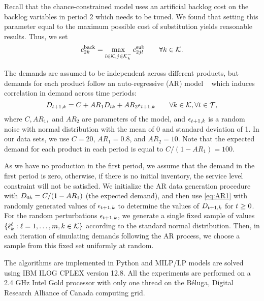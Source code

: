 \documentclass[msom]{oo}
\begin{document}
Recall that the chance-constrained model uses an artificial backlog cost on the backlog variables in period $2$ which needs to be tuned. We found that setting this parameter equal to the maximum possible cost of substitution yields reasonable results. Thus, we set
\begin{equation}
c^\text{back}_{ 2 k} = \max_{l \in \mathcal{K} ,j \in \mathcal{K}^-_k }c^{\text{sub}}_{2 j l  }  \qquad \forall k  \in \mathcal{K}.       \label{eq:backCost}
\end{equation} 


The demands are assumed to be independent across different products, but demands for each product follow an auto-regressive (AR) model ~\citep{jiang2017production} which induces correlation in demand across time periods: 
\begin{equation}
D_{ t+1,k} = C + AR_1 D_{t k} + AR_2 \epsilon_{t+1,k }  \qquad \forall k  \in \mathcal{K} , \forall t \in \mathcal{T},       \label{eq:AR1}
\end{equation}
where $C, AR_1,$ and $AR_2$ are parameters of the model, and $\epsilon_{ t+1,k}$ is a random noise with normal distribution with the mean of 0 and standard deviation of 1. 
In our data sets, we use $C = 20$, $AR_1 = 0.8$, and $AR_2 = 10$. Note that the expected demand for each product in each period is equal to $C/(1-AR_1)=100$. 

As we have no production in the first period, we assume that the demand in the first period is zero, otherwise, if there is no initial inventory, the service level constraint will not be satisfied. We initialize the AR data generation procedure with $D_{0 k}=C/(1-AR_1)$ (the expected demand), and then use \eqref{eq:AR1} with randomly generated values of $\epsilon_{t+1,k}$ to determine the values of $D_{t+1,k}$ for $t\geq 0$. 
For the random perturbations $\epsilon_{t+1,k}$, we generate a single fixed sample of values $\{\hat{\epsilon}^\ell_{k}: \ell=1,\ldots,m, k \in \mathcal{K} \}$ according to the standard normal distribution. Then, in each iteration of simulating demands following the AR process, we choose a sample from this fixed set uniformly at random.


The algorithms are implemented in Python and MILP/LP models are solved using IBM ILOG CPLEX version 12.8. All the experiments are performed on a 2.4 GHz Intel Gold processor with only one thread on the Béluga, Digital Research Alliance of Canada computing grid.
\end{document}
